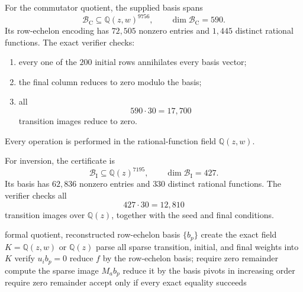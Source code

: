 \documentclass[10pt,letterpaper]{article}
\begin{document}
For the commutator quotient, the supplied basis spans
\begin{equation}\label{eq:comm-module}
 \mathcal B_{\mathrm C}\subseteq\mathbb Q(z,w)^{9756},
 \qquad
 \dim\mathcal B_{\mathrm C}=590.
\end{equation}
Its row-echelon encoding has \(72{,}505\) nonzero entries and \(1{,}445\) distinct rational functions.  The exact verifier checks:
\begin{enumerate}
\item every one of the \(200\) initial rows annihilates every basis vector;
\item the final column reduces to zero modulo the basis;
\item all
\begin{equation}\label{eq:comm-images}
 590\cdot30=17{,}700
\end{equation}
transition images reduce to zero.
\end{enumerate}
Every operation is performed in the rational-function field \(\mathbb Q(z,w)\).

For inversion, the certificate is
\begin{equation}\label{eq:inv-module}
 \mathcal B_{\mathrm I}\subseteq\mathbb Q(z)^{7195},
 \qquad
 \dim\mathcal B_{\mathrm I}=427.
\end{equation}
Its basis has \(62{,}836\) nonzero entries and \(330\) distinct rational functions.  The verifier checks all
\begin{equation}\label{eq:inv-images}
 427\cdot30=12{,}810
\end{equation}
transition images over \(\mathbb Q(z)\), together with the seed and final conditions.

\begin{algorithm}[t]
\caption{Exact symbolic certificate verification}\label{alg:certificate}
\begin{algorithmic}[1]
\Require formal quotient, reconstructed row-echelon basis \(\{b_p\}\)
\State create the exact field \(K=\mathbb Q(z,w)\) or \(\mathbb Q(z)\)
\State parse all sparse transition, initial, and final weights into \(K\)
  \State verify \(u_i b_p=0\)
\EndFor
\State reduce \(f\) by the row-echelon basis; require zero remainder
  \State compute the sparse image \(M_ab_p\)
  \State reduce it by the basis pivots in increasing order
  \State require zero remainder
\EndFor
\State accept only if every exact equality succeeds
\end{algorithmic}
\end{algorithm}
\end{document}
